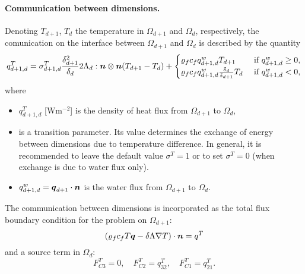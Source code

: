 \paragraph{Communication between dimensions.}
Denoting $T_{d+1}$, $T_d$ the temperature in $\Omega_{d+1}$ and $\Omega_d$, respectively, the comunication on the interface between $\Omega_{d+1}$ and $\Omega_d$ is described by the quantity
\begin{equation}
  \label{e:inter_dim_flux_heat}
  q^T_{d+1,d} = \sigma^T_{d+1,d} \frac{\delta_{d+1}^2}{\delta_d}2\Lambda_d:\n\otimes\n ( T_{d+1} - T_d) + \begin{cases} \varrho_f c_f q^w_{d+1,d} T_{d+1} & \mbox{ if }q^w_{d+1,d}\ge 0,\\\varrho_f c_f q^w_{d+1,d} \frac{\tilde s_d}{\tilde s_{d+1}} T_d & \mbox{ if } q^w_{d+1,d}<0,\end{cases}
\end{equation}
where
\begin{itemize}
\item $q^T_{d+1,d}$ [W$\mathrm{m}^{-2}$] is the density of heat flux from $\Omega_{d+1}$ to $\Omega_d$,
\item {} \units{}{}{} is a transition parameter.
Its value determines the exchange of energy between dimensions due to temperature difference.
In general, it is recommended to leave the default value $\sigma^T=1$ or to set $\sigma^T=0$ (when exchange is due to water flux only).
\item $q^w_{d+1,d}=\mathbf{\boldsymbol{q}}_{d+1}\cdot\mathbf{\boldsymbol{n}}$ is the water flux from $\Omega_{d+1}$ to $\Omega_d$.
\end{itemize}
The communication between dimensions is incorporated as the total flux boundary condition for the problem on $\Omega_{d+1}$:
\begin{equation}
\label{e:FC}
\left(\varrho_f c_f T \vc q - \delta\Lambda\nabla T\right)\cdot\vc n = q^T
\end{equation}
and a source term in $\Omega_d$:
\begin{equation}
F^T_{C3} = 0,\quad
F^T_{C2} = q^T_{32},\quad
F^T_{C1} = q^T_{21}.
\end{equation}




